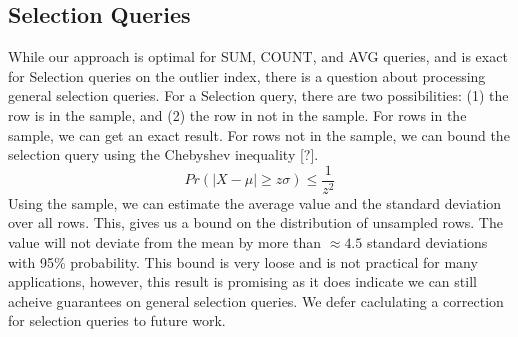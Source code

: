 \subsection{Selection Queries}
While our approach is optimal for SUM, COUNT, and AVG queries, and is exact for Selection queries on the outlier index, there is a question about processing general selection queries.
For a Selection query, there are two possibilities: (1) the row is in the sample, and (2) the row in not in the sample.
For rows in the sample, we can get an exact result.
For rows not in the sample, we can bound the selection query using the Chebyshev inequality [?].
\begin{equation}
Pr(|X-\mu|\ge z\sigma)\le \frac{1}{z^2}
\end{equation}
Using the sample, we can estimate the average value and the standard deviation over all rows.
This, gives us a bound on the distribution of unsampled rows.
The value will not deviate from the mean by more than $\approx 4.5$ standard deviations with 95\% probability.
This bound is very loose and is not practical for many applications, however, this result is promising as it does indicate 
we can still acheive guarantees on general selection queries.
We defer caclulating a correction for selection queries to future work.
